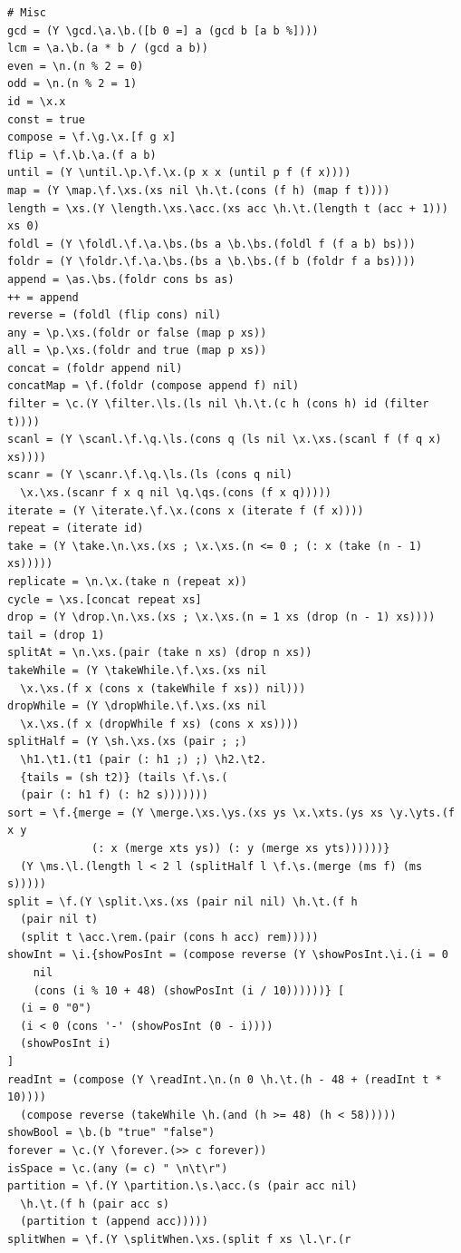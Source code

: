\begin{verbatim}
# Misc
gcd = (Y \gcd.\a.\b.([b 0 =] a (gcd b [a b %])))
lcm = \a.\b.(a * b / (gcd a b))
even = \n.(n % 2 = 0)
odd = \n.(n % 2 = 1)
id = \x.x
const = true
compose = \f.\g.\x.[f g x]
flip = \f.\b.\a.(f a b)
until = (Y \until.\p.\f.\x.(p x x (until p f (f x)))) 
map = (Y \map.\f.\xs.(xs nil \h.\t.(cons (f h) (map f t))))
length = \xs.(Y \length.\xs.\acc.(xs acc \h.\t.(length t (acc + 1))) xs 0)
foldl = (Y \foldl.\f.\a.\bs.(bs a \b.\bs.(foldl f (f a b) bs)))
foldr = (Y \foldr.\f.\a.\bs.(bs a \b.\bs.(f b (foldr f a bs))))
append = \as.\bs.(foldr cons bs as)
++ = append
reverse = (foldl (flip cons) nil) 
any = \p.\xs.(foldr or false (map p xs))
all = \p.\xs.(foldr and true (map p xs))
concat = (foldr append nil)
concatMap = \f.(foldr (compose append f) nil)
filter = \c.(Y \filter.\ls.(ls nil \h.\t.(c h (cons h) id (filter t))))
scanl = (Y \scanl.\f.\q.\ls.(cons q (ls nil \x.\xs.(scanl f (f q x) xs))))
scanr = (Y \scanr.\f.\q.\ls.(ls (cons q nil) 
  \x.\xs.(scanr f x q nil \q.\qs.(cons (f x q)))))
iterate = (Y \iterate.\f.\x.(cons x (iterate f (f x))))
repeat = (iterate id)
take = (Y \take.\n.\xs.(xs ; \x.\xs.(n <= 0 ; (: x (take (n - 1) xs)))))
replicate = \n.\x.(take n (repeat x))
cycle = \xs.[concat repeat xs]
drop = (Y \drop.\n.\xs.(xs ; \x.\xs.(n = 1 xs (drop (n - 1) xs))))
tail = (drop 1)
splitAt = \n.\xs.(pair (take n xs) (drop n xs))
takeWhile = (Y \takeWhile.\f.\xs.(xs nil 
  \x.\xs.(f x (cons x (takeWhile f xs)) nil)))
dropWhile = (Y \dropWhile.\f.\xs.(xs nil 
  \x.\xs.(f x (dropWhile f xs) (cons x xs))))
splitHalf = (Y \sh.\xs.(xs (pair ; ;) 
  \h1.\t1.(t1 (pair (: h1 ;) ;) \h2.\t2.
  {tails = (sh t2)} (tails \f.\s.(
  (pair (: h1 f) (: h2 s)))))))
sort = \f.{merge = (Y \merge.\xs.\ys.(xs ys \x.\xts.(ys xs \y.\yts.(f x y 
             (: x (merge xts ys)) (: y (merge xs yts))))))}
  (Y \ms.\l.(length l < 2 l (splitHalf l \f.\s.(merge (ms f) (ms s)))))
split = \f.(Y \split.\xs.(xs (pair nil nil) \h.\t.(f h 
  (pair nil t)
  (split t \acc.\rem.(pair (cons h acc) rem)))))
showInt = \i.{showPosInt = (compose reverse (Y \showPosInt.\i.(i = 0
    nil 
    (cons (i % 10 + 48) (showPosInt (i / 10))))))} [
  (i = 0 "0") 
  (i < 0 (cons '-' (showPosInt (0 - i))))
  (showPosInt i)
]
readInt = (compose (Y \readInt.\n.(n 0 \h.\t.(h - 48 + (readInt t * 10))))
  (compose reverse (takeWhile \h.(and (h >= 48) (h < 58)))))
showBool = \b.(b "true" "false")
forever = \c.(Y \forever.(>> c forever))
isSpace = \c.(any (= c) " \n\t\r")
partition = \f.(Y \partition.\s.\acc.(s (pair acc nil) 
  \h.\t.(f h (pair acc s)
  (partition t (append acc))))) 
splitWhen = \f.(Y \splitWhen.\xs.(split f xs \l.\r.(r 

\end{verbatim}
